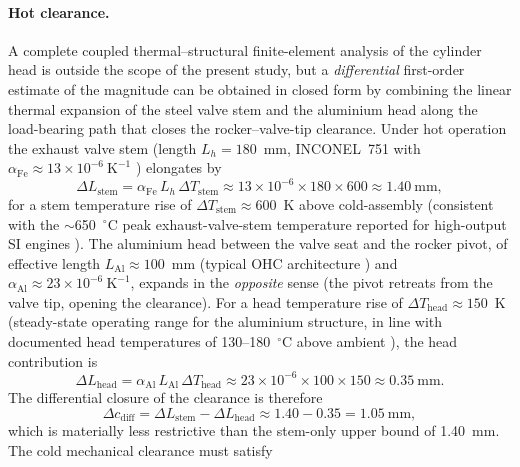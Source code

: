 \paragraph{Hot clearance.}
A complete coupled thermal--structural finite-element analysis of
the cylinder head is outside the scope of the present study, but a
\emph{differential} first-order estimate of the magnitude can be
obtained in closed form by combining the linear thermal expansion
of the steel valve stem and the aluminium head along the
load-bearing path that closes the rocker--valve-tip clearance. Under
hot operation the exhaust valve stem (length $L_{h}=180$~mm,
INCONEL~751 with $\alpha_{\mathrm{Fe}}\approx 13\times 10^{-6}~\mathrm{K}^{-1}$
\citep{specialmetals2008inconel751}) elongates by
\begin{equation}
\Delta L_{\mathrm{stem}}=\alpha_{\mathrm{Fe}}\,L_{h}\,\Delta T_{\mathrm{stem}}
\approx 13\times 10^{-6}\times 180\times 600 \approx 1.40~\mathrm{mm},
\label{eq:dLstem}
\end{equation}
for a stem temperature rise of $\Delta T_{\mathrm{stem}}\approx 600$~K
above cold-assembly (consistent with the
$\sim$650~$^{\circ}$C peak exhaust-valve-stem temperature reported
for high-output SI engines \citep{heisler2002}). The aluminium head
between the valve seat and the rocker pivot, of effective length
$L_{\mathrm{Al}}\approx 100$~mm (typical OHC architecture
\citep{heisler2002}) and
$\alpha_{\mathrm{Al}}\approx 23\times 10^{-6}~\mathrm{K}^{-1}$, expands
in the \emph{opposite} sense (the pivot retreats from the valve tip,
opening the clearance). For a head temperature rise of
$\Delta T_{\mathrm{head}}\approx 150$~K (steady-state operating
range for the aluminium structure, in line with documented head
temperatures of 130--180~$^{\circ}$C above ambient
\citep{heywood1988}), the head contribution is
\begin{equation}
\Delta L_{\mathrm{head}}=\alpha_{\mathrm{Al}}\,L_{\mathrm{Al}}\,\Delta T_{\mathrm{head}}
\approx 23\times 10^{-6}\times 100\times 150 \approx 0.35~\mathrm{mm}.
\label{eq:dLhead}
\end{equation}
The differential closure of the clearance is therefore
\begin{equation}
\Delta c_{\mathrm{diff}}=\Delta L_{\mathrm{stem}}-\Delta L_{\mathrm{head}}
\approx 1.40-0.35 = 1.05~\mathrm{mm},
\label{eq:dcdiff}
\end{equation}
which is materially less restrictive than the stem-only upper bound
of 1.40~mm. The cold mechanical clearance must satisfy
